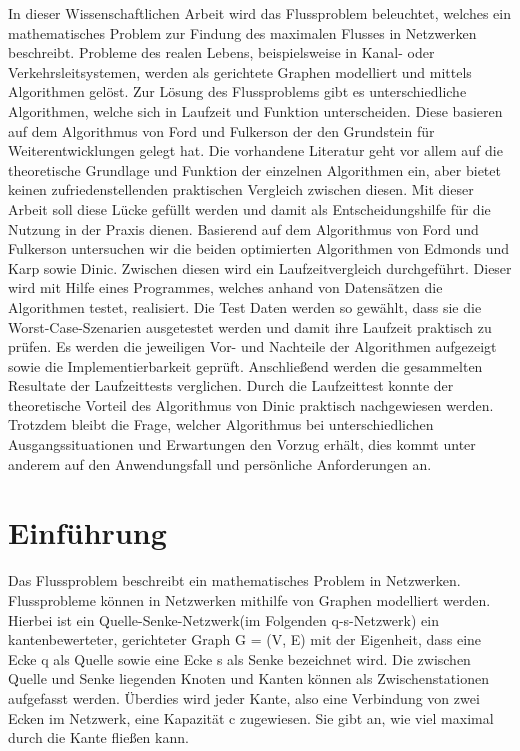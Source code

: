 \documentclass[a4paper]{llncs}
\begin{document}
In dieser Wissenschaftlichen Arbeit wird das Flussproblem beleuchtet, welches ein mathematisches Problem zur Findung des maximalen Flusses in Netzwerken beschreibt.
 Probleme des realen Lebens, beispielsweise in Kanal- oder Verkehrsleitsystemen, werden als gerichtete Graphen modelliert und mittels Algorithmen gelöst.
 Zur Lösung des Flussproblems gibt es unterschiedliche Algorithmen, welche sich in Laufzeit und Funktion unterscheiden. Diese basieren auf dem Algorithmus von Ford und Fulkerson der den Grundstein für Weiterentwicklungen gelegt hat.
 Die vorhandene Literatur geht vor allem auf die theoretische Grundlage und Funktion der einzelnen Algorithmen ein,  aber bietet keinen zufriedenstellenden praktischen Vergleich zwischen diesen.
 Mit dieser Arbeit soll diese Lücke gefüllt werden und damit als Entscheidungshilfe für die Nutzung in der Praxis dienen.
Basierend auf dem Algorithmus von Ford und Fulkerson untersuchen wir die beiden optimierten Algorithmen von Edmonds und Karp sowie Dinic.
Zwischen diesen wird ein Laufzeitvergleich durchgeführt.
Dieser wird mit Hilfe eines Programmes, welches anhand von Datensätzen die Algorithmen testet, realisiert.
Die Test Daten werden so gewählt, dass sie die Worst-Case-Szenarien ausgetestet werden und damit ihre Laufzeit praktisch zu prüfen.
Es werden die jeweiligen Vor- und Nachteile der Algorithmen aufgezeigt sowie die Implementierbarkeit geprüft. Anschließend werden die gesammelten Resultate der Laufzeittests verglichen.
Durch die Laufzeittest konnte der theoretische Vorteil des Algorithmus von Dinic praktisch nachgewiesen werden.
 Trotzdem bleibt die Frage, welcher Algorithmus bei unterschiedlichen Ausgangssituationen und Erwartungen den Vorzug erhält, dies kommt unter anderem auf den Anwendungsfall und persönliche Anforderungen an.

\section{Einführung}
\label{Einfuehrung}
Das Flussproblem beschreibt ein mathematisches Problem in Netzwerken.\\

Flussprobleme k\"onnen in Netzwerken mithilfe von Graphen modelliert werden. Hierbei ist ein Quelle-Senke-Netzwerk(im Folgenden q-s-Netzwerk) ein kantenbewerteter, gerichteter Graph G = (V, E) mit der Eigenheit, dass eine Ecke q als Quelle sowie eine Ecke s als Senke bezeichnet wird. Die zwischen Quelle und Senke liegenden Knoten und Kanten können als Zwischenstationen aufgefasst werden. \"Uberdies wird jeder Kante, also eine Verbindung von zwei Ecken im Netzwerk, eine Kapazität c zugewiesen. Sie gibt an, wie viel maximal durch die Kante fließen kann. \citep{Testref}
\end{document}
